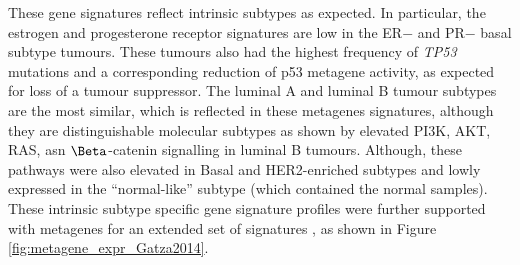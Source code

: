 \begin{figure}[!htp]
\noindent{} %
\end{figure}

These gene signatures reflect intrinsic subtypes as expected. In particular, the estrogen and progesterone receptor signatures are low in the ER$-$ and PR$-$ basal subtype tumours. These tumours also had the highest frequency of \textit{TP53} mutations and a corresponding reduction of p53 metagene activity, as expected for loss of a tumour suppressor. The luminal A and luminal B tumour subtypes are the most similar, which is reflected in these metagenes signatures, although they are distinguishable molecular subtypes as shown by elevated PI3K, AKT, RAS, asn $\Beta$-catenin signalling in luminal B tumours. Although, these pathways were also elevated in Basal and HER2-enriched subtypes and lowly expressed in the ``normal-like'' subtype (which contained the normal samples). These intrinsic subtype specific gene signature profiles were further supported with metagenes for an extended set of signatures \citep{Gatza2014}, as shown in Figure \ref{fig:metagene_expr_Gatza2014}.

